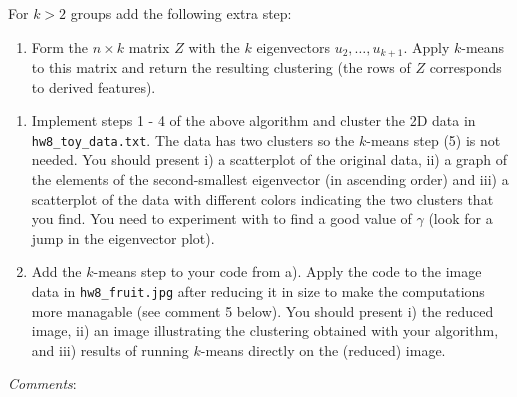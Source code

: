 \documentclass[11pt]{article}
\providecommand{\tightlist}{%
      \setlength{\itemsep}{0pt}\setlength{\parskip}{0pt}}
\begin{document}
For \(k>2\) groups add the following extra step:

\begin{enumerate}
\def\labelenumi{\arabic{enumi})}
\setcounter{enumi}{4}
\tightlist
\item
  Form the \(n \times k\) matrix \(Z\) with the \(k\) eigenvectors
  \(u_2,\ldots,u_{k+1}\). Apply \(k\)-means to this matrix and return
  the resulting clustering (the rows of \(Z\) corresponds to derived
  features).
\end{enumerate}

\begin{enumerate}
\def\labelenumi{\alph{enumi})}
\item
  Implement steps 1 - 4 of the above algorithm and cluster the 2D data
  in \texttt{hw8\_toy\_data.txt}. The data has two clusters so the
  \(k\)-means step (5) is not needed. You should present i) a
  scatterplot of the original data, ii) a graph of the elements of the
  second-smallest eigenvector (in ascending order) and iii) a
  scatterplot of the data with different colors indicating the two
  clusters that you find. You need to experiment with to find a good
  value of \(\gamma\) (look for a jump in the eigenvector plot).
\item
  Add the \(k\)-means step to your code from a). Apply the code to the
  image data in \texttt{hw8\_fruit.jpg} after reducing it in size to
  make the computations more managable (see comment 5 below). You should
  present i) the reduced image, ii) an image illustrating the clustering
  obtained with your algorithm, and iii) results of running \(k\)-means
  directly on the (reduced) image.
\end{enumerate}

\emph{Comments}:
\end{document}

